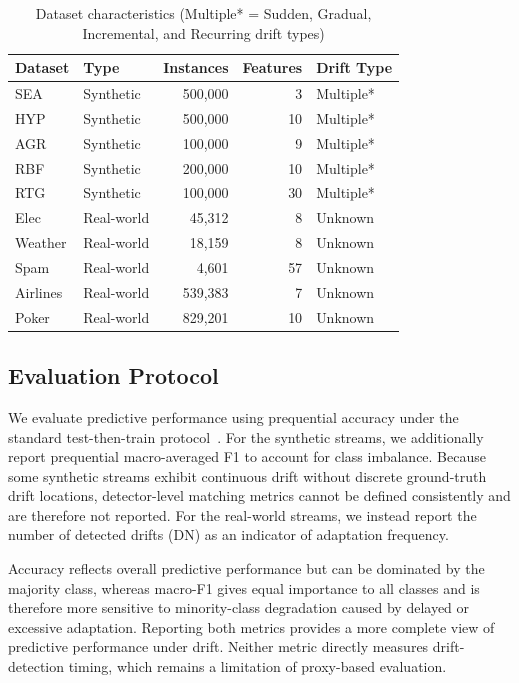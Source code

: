 \documentclass[conference]{IEEEtran}
\begin{document}
\begin{table}[!ht]
\centering
\caption{Dataset characteristics (Multiple* = Sudden, Gradual, Incremental, and Recurring drift types)}
\label{tab:datasets}
\small
\begin{tabular}{|l|l|r|r|l|}
\hline
\textbf{Dataset} & \textbf{Type} & \textbf{Instances} & \textbf{Features} & \textbf{Drift Type} \\
\hline
SEA & Synthetic & 500,000 & 3 & Multiple* \\
HYP & Synthetic & 500,000 & 10 & Multiple* \\
AGR & Synthetic & 100,000 & 9 & Multiple* \\
RBF & Synthetic & 200,000 & 10 & Multiple* \\
RTG & Synthetic & 100,000 & 30 & Multiple* \\
Elec & Real-world & 45,312 & 8 & Unknown \\
Weather & Real-world & 18,159 & 8 & Unknown \\
Spam & Real-world & 4,601 & 57 & Unknown \\
Airlines & Real-world & 539,383 & 7 & Unknown \\
Poker & Real-world & 829,201 & 10 & Unknown \\
\hline
\end{tabular}
\end{table}

\subsection{Evaluation Protocol}
We evaluate predictive performance using prequential accuracy under the standard test-then-train protocol~\cite{Bifet2010MOA}. For the synthetic streams, we additionally report prequential macro-averaged F1 to account for class imbalance. Because some synthetic streams exhibit continuous drift without discrete ground-truth drift locations, detector-level matching metrics cannot be defined consistently and are therefore not reported. For the real-world streams, we instead report the number of detected drifts (DN) as an indicator of adaptation frequency.

Accuracy reflects overall predictive performance but can be dominated by the majority class, whereas macro-F1 gives equal importance to all classes and is therefore more sensitive to minority-class degradation caused by delayed or excessive adaptation. Reporting both metrics provides a more complete view of predictive performance under drift. Neither metric directly measures drift-detection timing, which remains a limitation of proxy-based evaluation.
\end{document}
